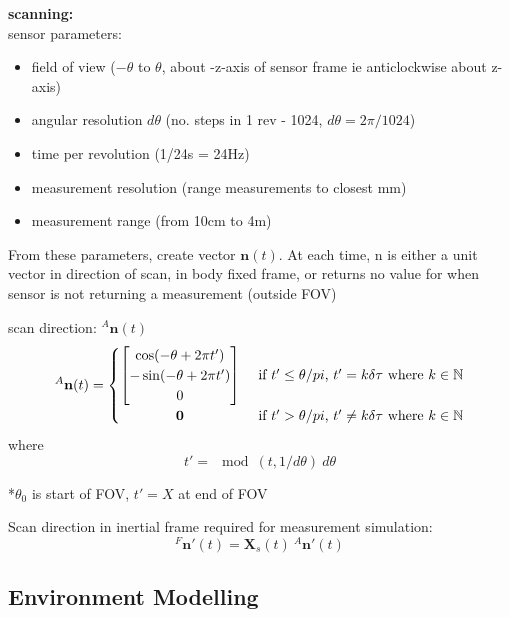 \textbf{scanning:}\\
sensor parameters:
\begin{itemize}
\item field of view ($-\theta$ to $\theta$, about -z-axis of sensor frame ie anticlockwise about z-axis)
\item angular resolution $d\theta$ (no. steps in 1 rev - 1024, $d\theta = 2\pi/1024$)
\item time per revolution (1/24s = 24Hz)
\item measurement resolution (range measurements to closest mm)
\item measurement range (from 10cm to 4m)
\end{itemize}
From these parameters, create vector $\mathbf{n}(t)$. At each time, n is either a unit vector in direction of scan, in body fixed frame, or returns no value for when sensor is not returning a measurement (outside FOV)

scan direction: $^{A}\mathbf{n}(t)$
\begin{equation}
^{A}\mathbf{n}(t) =
	\begin{cases} 
	      \hfill \begin{bmatrix}
	      		\cos(-\theta + 2\pi t') \\
	      		-\sin(-\theta + 2\pi t') \\
	      		0
	      	\end{bmatrix}    \hfill & \text{ if $t' \leq \theta/pi$, $t' = k\delta\tau$ where $k \in \mathbb{N}$} \\
	      \hfill \mathbf{0} \hfill & \text{ if $t' > \theta/pi$, $t' \neq k\delta\tau$ where $k \in \mathbb{N}$} \\
	\end{cases} 
\end{equation}
where
\begin{equation}
t' = \mod(t,1/d\theta)\:d\theta
\end{equation}

*$\theta_0$ is start of FOV, $t'=X$ at end of FOV

Scan direction in inertial frame required for measurement simulation:
\begin{equation}
	{^{F}\mathbf{n'}(t)} = \mathbf{X}_s(t)\:{^{A}\mathbf{n'}(t)}
\end{equation}

\subsection{Environment Modelling}

